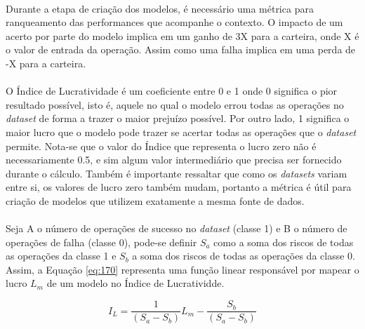 \paragraph{} Durante a etapa de criação dos modelos, é necessário uma métrica para ranqueamento das performances que acompanhe o contexto. O impacto de um acerto por parte do modelo implica em um ganho de 3X para a carteira, onde X é o valor de entrada da operação. Assim como uma falha implica em uma perda de -X para a carteira.

\paragraph{} O Índice de Lucratividade é um coeficiente entre 0 e 1 onde 0 significa o pior resultado possível, isto é, aquele no qual o modelo errou todas as operações no \textit{dataset} de forma a trazer o maior prejuízo possível. Por outro lado, 1 significa o maior lucro que o modelo pode trazer se acertar todas as operações que o \textit{dataset} permite. Nota-se que o valor do Índice que representa o lucro zero não é necessariamente 0.5, e sim algum valor intermediário que precisa ser fornecido durante o cálculo. Também é importante ressaltar que como os \textit{datasets} variam entre si, os valores de lucro zero também mudam, portanto a métrica é útil para criação de modelos que utilizem exatamente a mesma fonte de dados.

\paragraph{} Seja A o número de operações de sucesso no \textit{dataset} (classe 1) e B o número de operações de falha (classe 0), pode-se definir \begin{math} S_a \end{math} como a soma dos riscos de todas as operações da classe 1 e \begin{math} S_b \end{math} a soma dos riscos de todas as operações da classe 0. Assim, a Equação \ref{eq:170} representa uma função linear responsável por mapear o lucro \begin{math} L_m \end{math} de um modelo no Índice de Lucratividde.

\begin{equation} \label{eq:170}
    I_{L} = \dfrac{1}{(S_a - S_b)}L_m - \dfrac{S_b}{(S_a - S_b)}
\end{equation}

